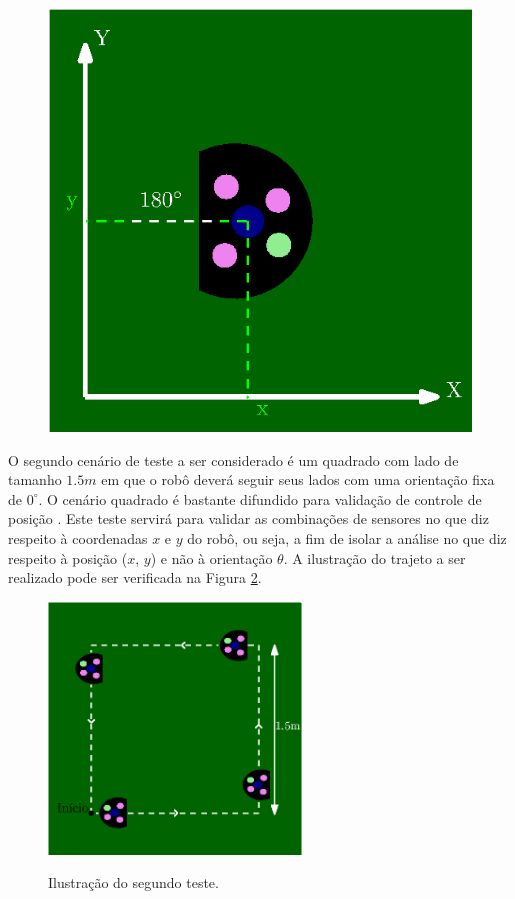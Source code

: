 \documentclass[acronym, symbols, table]{fei}
\begin{document}
\begin{figure}[!htb]
\begin{minipage}{0.45\textwidth}
				\includegraphics[width=\linewidth]{teste_1_180_graus.eps}
				\label{fig:metodologia_teste_1_b}
			\end{minipage}
		\end{figure}
		
		O segundo cenário de teste a ser considerado é um quadrado com lado de tamanho $1.5m$ em que o robô deverá seguir seus lados com uma orientação fixa de $0^\circ$. O cenário quadrado é bastante difundido para validação de controle de posição \cites{rostami2018localization}{gonccalves2008real}{santini1997trajectory}. Este teste servirá para validar as combinações de sensores no que diz respeito à coordenadas $x$ e $y$ do robô, ou seja, a fim de isolar a análise no que diz respeito à posição ($x$, $y$) e não à orientação $\theta$. A ilustração do trajeto a ser realizado pode ser verificada na Figura \ref{fig:metodologia_teste_2}.
		
		\begin{figure}[!htb]
			\centering
			\caption{Ilustração do segundo teste.}
			\includegraphics[width=0.6\textwidth]{teste_2.eps}
			\label{fig:metodologia_teste_2}
		\end{figure}
		
\end{document}
